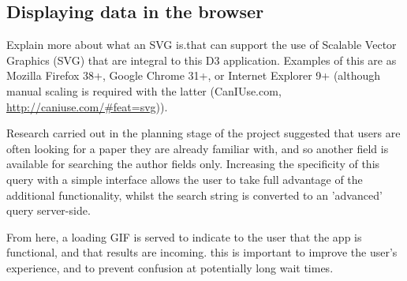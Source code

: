 \documentclass[Report.tex]{subfiles}
\begin{document}
\subsection{Displaying data in the browser}
Explain more about what an SVG is.that can support the use of Scalable Vector Graphics (SVG) that are integral to this D3 application. Examples of this are as Mozilla Firefox 38+, Google Chrome 31+, or Internet Explorer 9+ (although manual scaling is required with the latter (CanIUse.com, \url{http://caniuse.com/#feat=svg})).

Research carried out in the planning stage of the project suggested that users are often looking for a paper they are already familiar with, and so another field is available for searching the author fields only. Increasing the specificity of this query with a simple interface allows the user to take full advantage of the additional functionality, whilst the search string is converted to an 'advanced' query server-side.

From here, a loading GIF is served to indicate to the user that the app is functional, and that results are incoming. this is important to improve the user's experience, and to prevent confusion at potentially long wait times.
\end{document}
